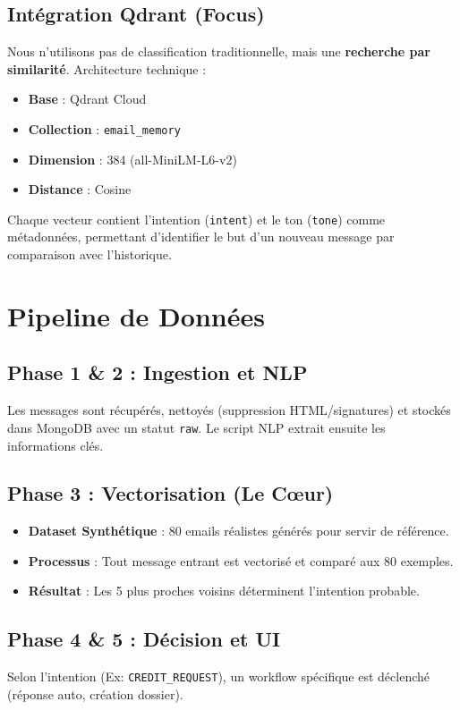 \documentclass[11pt,a4paper]{article}
\begin{document}
\subsection{Intégration Qdrant (Focus)}
Nous n'utilisons pas de classification traditionnelle, mais une \textbf{recherche par similarité}.
Architecture technique :
\begin{itemize}
    \item \textbf{Base} : Qdrant Cloud
    \item \textbf{Collection} : \texttt{email\_memory}
    \item \textbf{Dimension} : 384 (all-MiniLM-L6-v2)
    \item \textbf{Distance} : Cosine
\end{itemize}

Chaque vecteur contient l'intention (\texttt{intent}) et le ton (\texttt{tone}) comme métadonnées, permettant d'identifier le but d'un nouveau message par comparaison avec l'historique.

\section{Pipeline de Données}

\subsection{Phase 1 & 2 : Ingestion et NLP}
Les messages sont récupérés, nettoyés (suppression HTML/signatures) et stockés dans MongoDB avec un statut \texttt{raw}. Le script NLP extrait ensuite les informations clés.

\subsection{Phase 3 : Vectorisation (Le Cœur)}
\begin{itemize}
    \item \textbf{Dataset Synthétique} : 80 emails réalistes générés pour servir de référence.
    \item \textbf{Processus} : Tout message entrant est vectorisé et comparé aux 80 exemples.
    \item \textbf{Résultat} : Les 5 plus proches voisins déterminent l'intention probable.
\end{itemize}

\subsection{Phase 4 & 5 : Décision et UI}
Selon l'intention (Ex: \texttt{CREDIT\_REQUEST}), un workflow spécifique est déclenché (réponse auto, création dossier).
\end{document}
